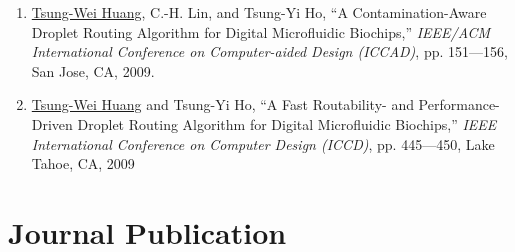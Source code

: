 \documentclass[A4,11pt]{article}
\begin{document}
\begin{enumerate}
    \item \underline{Tsung-Wei Huang}, C.-H. Lin, and Tsung-Yi Ho, ``A Contamination-Aware Droplet Routing Algorithm for Digital Microfluidic Biochips,'' \textit{IEEE/ACM International Conference on Computer-aided Design (ICCAD)}, pp. 151—156, San Jose, CA, 2009. 
    \item \underline{Tsung-Wei Huang} and Tsung-Yi Ho, ``A Fast Routability- and Performance-Driven Droplet Routing Algorithm for Digital Microfluidic Biochips,'' \textit{IEEE International Conference on Computer Design (ICCD)}, pp. 445—450, Lake Tahoe, CA, 2009

 \end{enumerate}

\section{Journal Publication}
\end{document}
